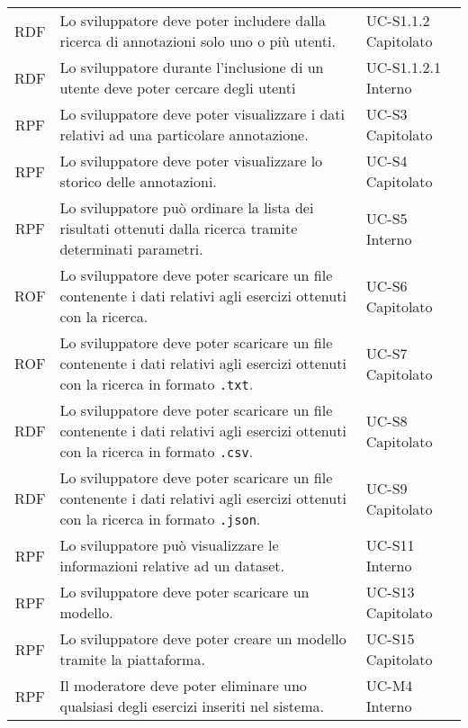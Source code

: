 \begin{tabularx}{\textwidth}{| c | p{10cm} | X |}
		RDF & Lo sviluppatore deve poter includere dalla ricerca di annotazioni solo uno o più utenti. & UC-S1.1.2 \newline Capitolato\\
		RDF & Lo sviluppatore durante l'inclusione di un utente deve poter cercare degli utenti & UC-S1.1.2.1 \newline Interno\\		
		RPF & Lo sviluppatore deve poter visualizzare i dati relativi ad una particolare annotazione. & UC-S3 \newline Capitolato\\
		RPF & Lo sviluppatore deve poter visualizzare lo storico delle annotazioni. & UC-S4 \newline Capitolato\\
		RPF & Lo sviluppatore può ordinare la lista dei risultati ottenuti dalla ricerca tramite determinati parametri. & UC-S5 \newline Interno\\	
		ROF & Lo sviluppatore deve poter scaricare un file contenente i dati relativi agli esercizi ottenuti con la ricerca. & UC-S6 \newline Capitolato\\
		ROF & Lo sviluppatore deve poter scaricare un file contenente i dati relativi agli esercizi ottenuti con la ricerca in formato \texttt{.txt}. & UC-S7 \newline Capitolato\\
		RDF & Lo sviluppatore deve poter scaricare un file contenente i dati relativi agli esercizi ottenuti con la ricerca in formato \texttt{.csv}. & UC-S8 \newline Capitolato\\
		RDF & Lo sviluppatore deve poter scaricare un file contenente i dati relativi agli esercizi ottenuti con la ricerca in formato \texttt{.json}. & UC-S9 \newline Capitolato\\
		RPF & Lo sviluppatore può visualizzare le informazioni relative ad un dataset. & UC-S11 \newline Interno\\
		RPF & Lo sviluppatore deve poter scaricare un modello. & UC-S13 \newline Capitolato\\
		RPF & Lo sviluppatore deve poter creare un modello tramite la piattaforma. & UC-S15 \newline Capitolato\\ 
		RPF & Il moderatore deve poter eliminare uno qualsiasi degli esercizi inseriti nel sistema. & UC-M4 \newline Interno\\

\end{tabularx}
